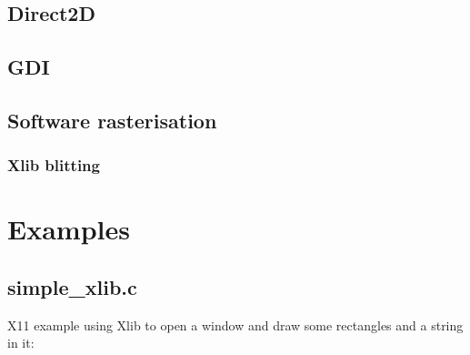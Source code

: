 \documentclass{article}
\begin{document}
\subsection{Direct2D}
\label{subsec:direct2d}


\subsection{GDI}
\label{subsec:windows-gdi}


\subsection{Software rasterisation}
\label{subsec:software-rasterisation}


\subsubsection{Xlib blitting}
\label{subsubsection:xlib-blitting}


\section{Examples}
\label{sec:examples}

\subsection{simple\_xlib.c}
\label{subsec:simple_xlib.c}

X11 example using Xlib to open a window and draw some rectangles and a string
in it:


\end{document}
